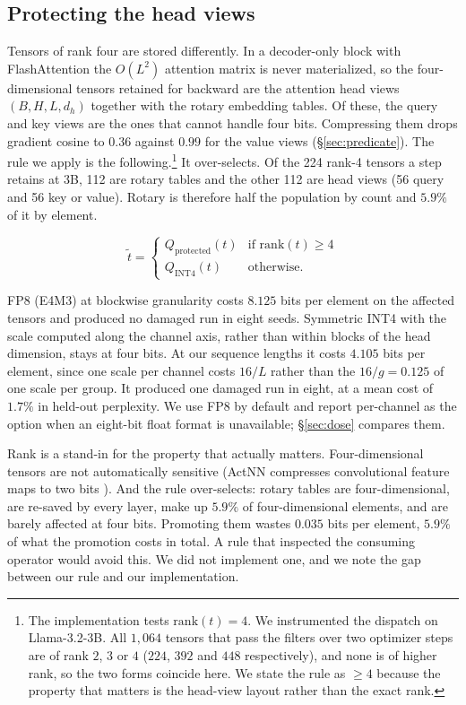 \documentclass[11pt,letterpaper]{article}
\begin{document}
\subsection{Protecting the head views}
\label{sec:method_qk}

Tensors of rank four are stored differently. In a decoder-only block with FlashAttention the $O(L^2)$ attention matrix is never materialized, so the four-dimensional tensors retained for backward are the attention head views $(B, H, L, d_h)$ together with the rotary embedding tables. Of these, the query and key views are the ones that cannot handle four bits. Compressing them drops gradient cosine to $0.36$ against $0.99$ for the value views (\S\ref{sec:predicate}). The rule we apply is the following.\footnote{The implementation tests $\mathrm{rank}(t) = 4$. We instrumented the dispatch on Llama-3.2-3B. All $1{,}064$ tensors that pass the filters over two optimizer steps are of rank $2$, $3$ or $4$ ($224$, $392$ and $448$ respectively), and none is of higher rank, so the two forms coincide here. We state the rule as $\geq 4$ because the property that matters is the head-view layout rather than the exact rank.} It over-selects. Of the 224 rank-4 tensors a step retains at 3B, 112 are rotary tables and the other 112 are head views (56 query and 56 key or value). Rotary is therefore half the population by count and $5.9\%$ of it by element.

\begin{equation}
\tilde{t} =
\begin{cases}
Q_{\text{protected}}(t) & \text{if } \mathrm{rank}(t) \geq 4 \\
Q_{\text{INT4}}(t) & \text{otherwise.}
\end{cases}
\label{eq:dcr_dispatch}
\end{equation}

FP8 (E4M3) at blockwise granularity costs $8.125$ bits per element on the affected tensors and produced no damaged run in eight seeds. Symmetric INT4 with the scale computed along the channel axis, rather than within blocks of the head dimension, stays at four bits. At our sequence lengths it costs $4.105$ bits per element, since one scale per channel costs $16/L$ rather than the $16/g = 0.125$ of one scale per group. It produced one damaged run in eight, at a mean cost of $1.7\%$ in held-out perplexity. We use FP8 by default and report per-channel as the option when an eight-bit float format is unavailable; \S\ref{sec:dose} compares them.

Rank is a stand-in for the property that actually matters. Four-dimensional tensors are not automatically sensitive (ActNN compresses convolutional feature maps to two bits \citep{chen2021actnn}). And the rule over-selects: rotary tables are four-dimensional, are re-saved by every layer, make up $5.9\%$ of four-dimensional elements, and are barely affected at four bits. Promoting them wastes $0.035$ bits per element, $5.9\%$ of what the promotion costs in total. A rule that inspected the consuming operator would avoid this. We did not implement one, and we note the gap between our rule and our implementation.
\end{document}
